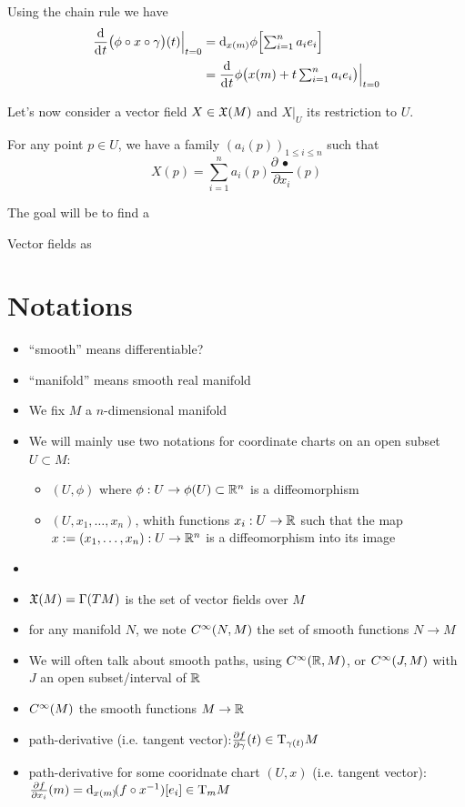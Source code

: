 		Using the chain rule we have
		\begin{align*}
			\frac{\d}{\di{t}} \big( \phi \circ x \circ \gamma \big)(t) \Big|_{t=0} &= \di[x(m)]{\phi} \Big[ {\textstyle\sum_{i=1}^n a_i e_i} \Big] \\
			                                                                       &= \frac{\d}{\di{t}} \phi\big( x(m) + {\textstyle t \sum_{i=1}^n a_i e_i} \big) \Big|_{t=0}
		\end{align*}



		Let's now consider a vector field $X \in \mathfrak{X}(M)$ and $X|_U$ its restriction to $U$.

		For any point $p \in U$, we have a family $(a_i(p))_{1 \leq i \leq n}$ such that
		$$
			X(p) = \sum_{i=1}^n a_i(p) \frac{\partial \,\bullet\,}{\partial{x_i}}(p)
		$$

		The goal will be to find a 

		Vector fields as 

\section{Notations}

	\begin{itemize}
		\item ``smooth'' means differentiable?
		\item ``manifold'' means smooth real manifold
		\item We fix $M$ a $n$-dimensional manifold
		\item We will mainly use two notations for coordinate charts on an open subset $U \subset M$:
			\begin{itemize}
				\item $(U, \phi)$ where $\phi: U \to \phi(U) \subset \mathbb{R}^n$ is a diffeomorphism
				\item $(U, x_1, \ldots, x_n)$, whith functions $x_i: U \to \mathbb{R}$ such that the map $x := (x_1, \ldots, x_n) : U \to \mathbb{R}^n$ is a diffeomorphism into its image
			\end{itemize}
		\item {}
		\item $\mathfrak{X}(M) = \Gamma(TM)$ is the set of vector fields over $M$
		\item for any manifold $N$, we note $C^\infty(N, M)$ the set of smooth functions $N \to M$ 
		\item We will often talk about smooth paths, using $C^\infty(\mathbb{R}, M)$, or $C^\infty(J, M)$ with $J$ an open subset/interval of $\mathbb{R}$
		\item $C^\infty(M)$ the smooth functions $M \to \mathbb{R}$
		\item path-derivative (i.e. tangent vector):$\frac{\partial{f}}{\partial{\gamma}}(t) \in \mathrm{T}_{\gamma(t)}{M}$
		\item path-derivative for some cooridnate chart $(U,x)$ (i.e. tangent vector): $\frac{\partial{f}}{\partial{x_i}}(m) = \di[x(m)](f \circ x^{-1})[e_i] \in \T_m{M}$
	\end{itemize}

